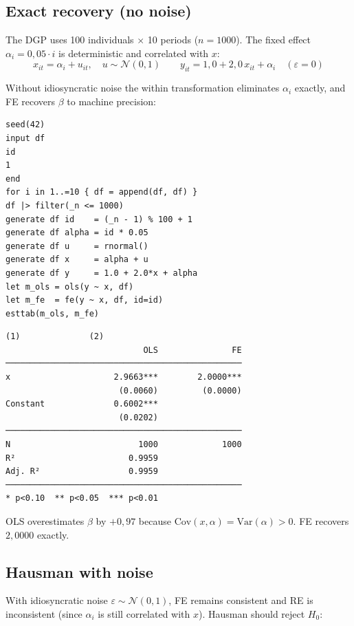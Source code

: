 \subsection*{Exact recovery (no noise)}

The DGP uses 100 individuals $\times$ 10 periods ($n = 1000$). The fixed effect
$\alpha_i = 0{,}05\cdot i$ is deterministic and correlated with $x$:
\[
  x_{it} = \alpha_i + u_{it},\quad u \sim \mathcal{N}(0,1)
  \qquad
  y_{it} = 1{,}0 + 2{,}0\,x_{it} + \alpha_i \quad(\varepsilon = 0)
\]

Without idiosyncratic noise the within transformation eliminates $\alpha_i$
exactly, and FE recovers $\beta$ to machine precision:

\begin{lstlisting}[caption={FE with correlated fixed effect --- no noise}]
seed(42)
input df
id
1
end
for i in 1..=10 { df = append(df, df) }
df |> filter(_n <= 1000)
generate df id    = (_n - 1) % 100 + 1
generate df alpha = id * 0.05
generate df u     = rnormal()
generate df x     = alpha + u
generate df y     = 1.0 + 2.0*x + alpha
let m_ols = ols(y ~ x, df)
let m_fe  = fe(y ~ x, df, id=id)
esttab(m_ols, m_fe)
\end{lstlisting}

\begin{lstlisting}[language={}, basicstyle=\ttfamily\small,
  frame=none, numbers=none, backgroundcolor=\color{codbg},
  xleftmargin=0pt, xrightmargin=0pt, breaklines=false]
                            (1)              (2)
                            OLS               FE
────────────────────────────────────────────────
x                     2.9663***        2.0000***
                       (0.0060)         (0.0000)
Constant              0.6002***
                       (0.0202)
────────────────────────────────────────────────
N                          1000             1000
R²                       0.9959
Adj. R²                  0.9959
────────────────────────────────────────────────
* p<0.10  ** p<0.05  *** p<0.01
\end{lstlisting}

OLS overestimates $\beta$ by $+0{,}97$ because $\mathrm{Cov}(x,\alpha) =
\mathrm{Var}(\alpha) > 0$. FE recovers $2{,}0000$ exactly.

\subsection*{Hausman with noise}

With idiosyncratic noise $\varepsilon \sim \mathcal{N}(0,1)$, FE remains
consistent and RE is inconsistent (since $\alpha_i$ is still correlated
with $x$). Hausman should reject $H_0$:

